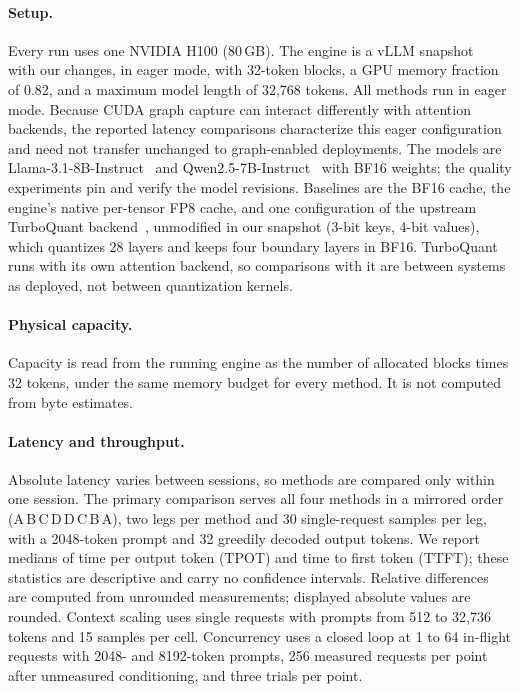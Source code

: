 \documentclass{article}
\begin{document}
\paragraph{Setup.}
Every run uses one NVIDIA H100 (80\,GB). The engine is a vLLM snapshot~\citep{kwon2023vllm} with our changes, in eager
mode, with 32-token blocks, a GPU memory fraction of 0.82, and a maximum model length of 32,768 tokens.
All methods run in eager mode. Because CUDA graph capture can interact differently with attention
backends, the reported latency comparisons characterize this eager configuration and need not transfer
unchanged to graph-enabled deployments.
The models are Llama-3.1-8B-Instruct~\citep{meta2024llama31} and Qwen2.5-7B-Instruct~\citep{yang2024qwen25} with BF16
weights; the quality experiments pin and verify the model revisions. Baselines are the BF16 cache, the engine's native per-tensor FP8 cache, and one configuration of
the upstream TurboQuant backend~\citep{vllm2026turboquant}, unmodified in our snapshot (3-bit keys,
4-bit values), which quantizes 28 layers and keeps four boundary layers in BF16. TurboQuant
runs with its own attention backend, so comparisons with it are between systems as deployed, not
between quantization kernels.

\paragraph{Physical capacity.}
Capacity is read from the running engine as the number of allocated blocks times 32 tokens, under the
same memory budget for every method. It is not computed from byte estimates.

\paragraph{Latency and throughput.}
Absolute latency varies between sessions, so methods are compared only within one session. The primary
comparison serves all four methods in a mirrored order (A\,B\,C\,D\,D\,C\,B\,A), two legs per method
and 30 single-request samples per leg, with a 2048-token prompt and 32 greedily decoded output tokens.
We report medians of time per output token (TPOT) and time to first token (TTFT); these statistics are
descriptive and carry no confidence intervals. Relative differences are computed from unrounded
measurements; displayed absolute values are rounded. Context scaling uses single requests with prompts from
512 to 32,736 tokens and 15 samples per cell. Concurrency uses a closed loop at 1 to 64 in-flight
requests with 2048- and 8192-token prompts, 256 measured requests per point after unmeasured
conditioning, and three trials per point.
\end{document}
